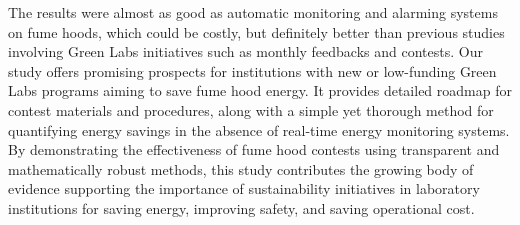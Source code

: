 \documentclass[12pt, twocolumn]{article}
\begin{document}
The results were almost as good as automatic monitoring and alarming systems on fume hoods, which could be costly, but definitely better than previous studies involving Green Labs initiatives such as monthly feedbacks and contests. Our study offers promising prospects for institutions with new or low-funding Green Labs programs aiming to save fume hood energy. It provides detailed roadmap for contest materials and procedures, along with a simple yet thorough method for quantifying energy savings in the absence of real-time energy monitoring systems. By demonstrating the effectiveness of fume hood contests using transparent and mathematically robust methods, this study contributes the growing body of evidence supporting the importance of sustainability initiatives in laboratory institutions for saving energy, improving safety, and saving operational cost. 
\onecolumn
\end{document}
